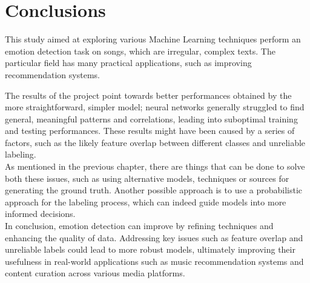 \chapter*{Conclusions}
\label{ch:conclusions}
This study aimed at exploring various Machine Learning techniques perform an
emotion detection task on songs, which are irregular, complex texts.
The particular field has many practical applications, such as improving
recommendation systems.

The results of the project point towards better performances obtained by the more
straightforward, simpler model; neural networks generally struggled to find
general, meaningful patterns and correlations, leading into suboptimal
training and testing performances. These results might have been caused by a
series of factors, such as the likely feature overlap between different classes and
unreliable labeling.\\

As mentioned in the previous chapter, there are things that can be done to
solve both these issues, such as using alternative models, techniques or
sources for generating the ground truth. Another possible approach
is to use a probabilistic approach for the labeling process, which
can indeed guide models into more informed decisions.\\


In conclusion, emotion detection can improve by refining techniques and enhancing the quality of data.
Addressing key issues such as feature overlap and unreliable labels
could lead to more robust models, ultimately improving their
usefulness in real-world applications such as music recommendation systems
and content curation across various media platforms.